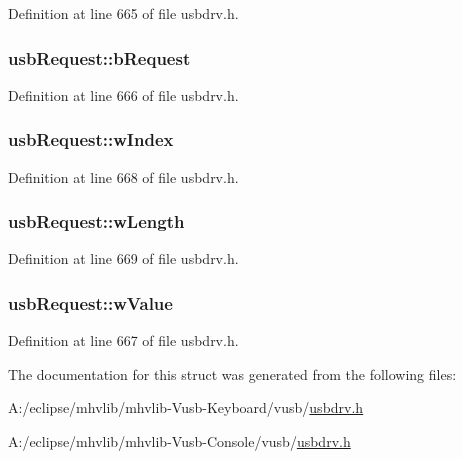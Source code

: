 Definition at line 665 of file usbdrv.\-h.

\hypertarget{structusb_request_a34c18b1dd0af60774cac48b176220c2c}{
\subsubsection[{b\-Request}]{ usb\-Request\-::b\-Request}}\label{structusb_request_a34c18b1dd0af60774cac48b176220c2c}


Definition at line 666 of file usbdrv.\-h.

\hypertarget{structusb_request_aefa059246bf079d5b42af148a2ad6a95}{
\subsubsection[{w\-Index}]{ usb\-Request\-::w\-Index}}\label{structusb_request_aefa059246bf079d5b42af148a2ad6a95}


Definition at line 668 of file usbdrv.\-h.

\hypertarget{structusb_request_a770437881c2e37d1384982fe26d87e7f}{
\subsubsection[{w\-Length}]{ usb\-Request\-::w\-Length}}\label{structusb_request_a770437881c2e37d1384982fe26d87e7f}


Definition at line 669 of file usbdrv.\-h.

\hypertarget{structusb_request_ab3f8687bb757c53ed03c3ce4310dc5c5}{
\subsubsection[{w\-Value}]{ usb\-Request\-::w\-Value}}\label{structusb_request_ab3f8687bb757c53ed03c3ce4310dc5c5}


Definition at line 667 of file usbdrv.\-h.



The documentation for this struct was generated from the following files\-:\begin{DoxyCompactItemize}
\item 
A\-:/eclipse/mhvlib/mhvlib-\/\-Vusb-\/\-Keyboard/vusb/\hyperlink{mhvlib-_vusb-_keyboard_2vusb_2usbdrv_8h}{usbdrv.\-h}\item 
A\-:/eclipse/mhvlib/mhvlib-\/\-Vusb-\/\-Console/vusb/\hyperlink{mhvlib-_vusb-_console_2vusb_2usbdrv_8h}{usbdrv.\-h}\end{DoxyCompactItemize}
